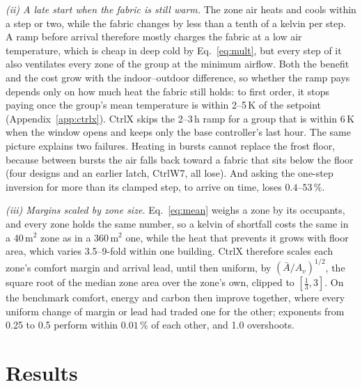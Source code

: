 \documentclass{article}
\begin{document}
\emph{(ii) A late start when the fabric is still warm.} The zone air heats and cools within a
step or two, while the fabric changes by less than a tenth of a kelvin per step. A ramp before
arrival therefore mostly charges the fabric at a low air temperature, which is cheap in deep cold
by Eq.~\eqref{eq:mult}, but every step of it also ventilates every zone of the group at the
minimum airflow. Both the benefit and the cost grow with the indoor--outdoor difference, so
whether the ramp pays depends only on how much heat the fabric still holds: to first order, it
stops paying once the group's mean temperature is within 2--5\,K of the setpoint
(Appendix~\ref{app:ctrlx}). CtrlX skips the 2--3\,h ramp for a group that is within 6\,K when the
window opens and keeps only the base controller's last hour. The same picture explains two
failures. Heating in bursts cannot replace the frost floor, because between bursts the air falls
back toward a fabric that sits below the floor (four designs and an earlier latch, CtrlW7, all
lose). And asking the one-step inversion for more than its clamped step, to arrive on time,
loses $0.4$--$53\,\%$.

\emph{(iii) Margins scaled by zone size.} Eq.~\eqref{eq:mean} weighs a zone by its occupants,
and every zone holds the same number, so a kelvin of shortfall costs the same in a 40\,m$^2$ zone
as in a 360\,m$^2$ one, while the heat that prevents it grows with floor area, which varies
3.5--9-fold within one building. CtrlX therefore scales each zone's comfort margin and arrival
lead, until then uniform, by $(\bar A/A_v)^{1/2}$, the square root of the median zone area over
the zone's own, clipped to $[\tfrac13,3]$. On the benchmark comfort, energy and carbon then
improve together, where every uniform change of margin or lead had traded one for the other;
exponents from 0.25 to 0.5 perform within $0.01\,\%$ of each other, and 1.0 overshoots.

\section{Results}
\label{sec:results}
\end{document}
